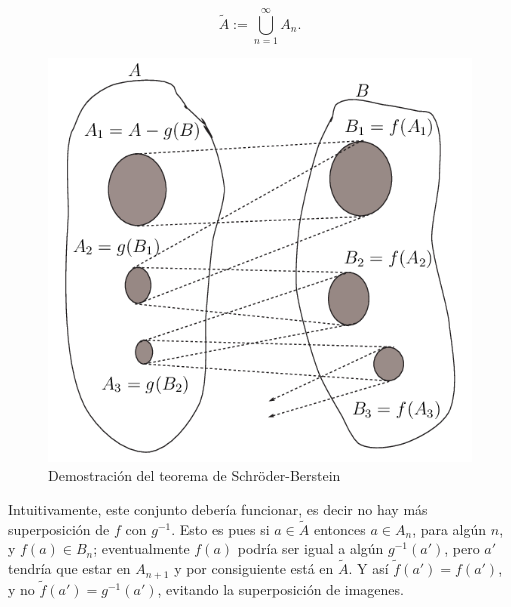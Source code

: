 \begin{equation}\label{defatilde}
\tilde{A}:=\bigcup_{n=1}^{\infty}A_n.
\end{equation}


\begin{figure}[h]
 \begin{center}
\includegraphics[scale=.5]{imagenes/schber4.png}
\end{center}
 \caption{Demostración del teorema de Schr\"oder-Berstein}\label{figura4}
\end{figure}

Intuitivamente, este conjunto debería  funcionar, es decir no
hay más superposición de $f$ con $g^{-1}$. Esto es pues si
$a\in\tilde{A}$ entonces $a\in A_n$, para algún $n$, y $f(a)\in
B_n$; eventualmente $f(a)$ podría ser igual a algún
$g^{-1}(a')$, pero $a'$ tendría que estar en $A_{n+1}$ y por
consiguiente está en $\tilde{A}$. Y así
$\tilde{f}(a')=f(a')$, y no $\tilde{f}(a')=g^{-1}(a')$, evitando
la superposición de imagenes.

